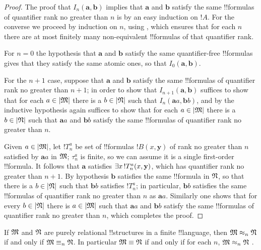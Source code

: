 \documentclass[../../include/open-logic-section]{subfiles}
\begin{document}
\begin{proof}
  The proof that $I_n(\mathbf{a},\mathbf{b})$ implies that
  $\mathbf{a}$ and $\mathbf{b}$ satisfy the same !!{formula}s of
  quantifier rank no greater than $n$ is by an easy induction on
  $!A$. For the converse we proceed by induction on $n$, using
  , which ensures that for each $n$
  there are at most finitely many non-equivalent !!{formula}s of that
  quantifier rank.

  For $n=0$ the hypothesis that $\mathbf{a}$ and $\mathbf{b}$ satisfy
  the same quantifier-free !!{formula}s gives that they satisfy the same
  atomic ones, so that $I_0(\mathbf{a},\mathbf{b})$.

  For the $n+1$ case, suppose that $\mathbf{a}$ and $\mathbf{b}$
  satisfy the same !!{formula}s of quantifier rank no greater than
  $n+1$; in order to show that $I_{n+1}(\mathbf{a},\mathbf{b})$
  suffices to show that for each $a \in \left| \mathfrak M \right|$ there is a $b \in
  \left| \mathfrak N \right|$ such that $I_n(\mathbf{a}a,\mathbf{b}b)$, and by the
  inductive hypothesis again suffices to show that for each $a \in
  \left| \mathfrak M \right|$ there is a $b \in \left| \mathfrak N \right|$ such that $\mathbf{a}a$ and
  $\mathbf{b}b$ satisfy the same !!{formula}s of quantifier rank no
  greater than $n$.

  Given $a \in \left| \mathfrak M \right|$, let $!T^a_n$ be set of !!{formula}s
  $!B(x,\mathbf{y})$ of rank no greater than $n$ satisfied by
  $\mathbf{a}a$ in $\mathfrak M$; $\tau^a_n$ is finite, so we can
  assume it is a single first-order !!{formula}. It follows that
  $\mathbf{a}$ satisfies $\lexists[x][!T^a_n(x,\mathbf{y})]$, which
  has quantifier rank no greater than $n+1$. By hypothesis
  $\mathbf{b}$ satisfies the same !!{formula} in $\mathfrak N$, so that
  there is a $b \in \left| \mathfrak N \right|$ such that $\mathbf{b}b$ satisfies
  $!T^a_n$; in particular, $\mathbf{b}b$ satisfies the same
  !!{formula}s of quantifier rank no greater than $n$ as
  $\mathbf{a}a$. Similarly one shows that for every $b \in \left| \mathfrak N \right|$
  there is $a\in \left| \mathfrak M \right|$ such that $\mathbf{a}a$ and $\mathbf{b}b$
  satisfy the same !!{formula}s of quantifier rank no greater than $n$,
  which completes the proof.
\end{proof}

\begin{cor}
  If $\mathfrak M$ and $\mathfrak N$ are purely relational !!{structure}s
  in a finite !!{language}, then $\mathfrak M \approx_n\mathfrak N$ if and
  only if $\Struct{M} \elemequiv[n] \Struct{N}$. In particular
  $\Struct{M} \elemequiv \Struct{N}$ if and only if for each $n$,
  $\mathfrak M \approx_n \mathfrak N$ .
\end{cor}
\end{document}
